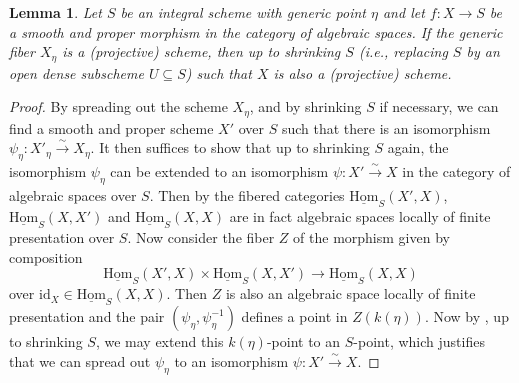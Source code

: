 \documentclass[11pt, letterpaper]{amsart}
\theoremstyle{plain}
\newtheorem{lemma}[theorem]{Lemma}
\theoremstyle{definition}
\newcommand{\Hom}{\mathrm{Hom}}
\newcommand{\<}{\langle}
\renewcommand{\>}{\rangle}
\newcommand{\sto}{\stackrel{\sim}{\to}}
\begin{document}
\begin{lemma}
\label{lem: spreading out}
    Let $S$ be an integral scheme with generic point $\eta$ and let $f : X \to S$ be a smooth and proper morphism in the category of algebraic spaces. 
    If the generic fiber $X_\eta$ is a (projective) scheme, then up to shrinking $S$ (i.e., replacing $S$ by an open dense subscheme $U \subseteq S$) such that $X$ is also a (projective) scheme. 
\end{lemma}
\begin{proof}
    By spreading out the scheme $X_\eta$, and by shrinking $S$ if necessary, we can find a smooth and proper scheme $X'$ over $S$ such that there is an isomorphism $\psi_\eta : X'_\eta \sto X_\eta$. 
    It then suffices to show that up to shrinking $S$ again, the isomorphism $\psi_\eta$ can be extended to an isomorphism $\psi : X' \sto X$ in the category of algebraic spaces over $S$. Then by \cite[Thm~1.1]{Olsson} the fibered categories $\underline{\Hom}_S(X', X)$, $\underline{\Hom}_S(X, X')$ and $\underline{\Hom}_S(X, X)$ are in fact algebraic spaces locally of finite presentation over $S$. Now consider the fiber $Z$ of the morphism given by composition 
    $$ \underline{\Hom}_S(X', X) \times \underline{\Hom}_S(X, X') \to \underline{\Hom}_S(X, X) $$
    over $\mathrm{id}_X \in \underline{\Hom}_S(X, X)$. Then $Z$ is also an algebraic space locally of finite presentation and the pair $(\psi_\eta, \psi^{-1}_\eta)$ defines a point in $Z(k(\eta))$. Now by \cite[\href{https://stacks.math.columbia.edu/tag/05N0}{Tag 05N0}]{stacks-project}, up to shrinking $S$, we may extend this $k(\eta)$-point to an $S$-point, which justifies that we can spread out $\psi_\eta$ to an isomorphism $\psi : X' \sto X$. 
\end{proof}
\end{document}
